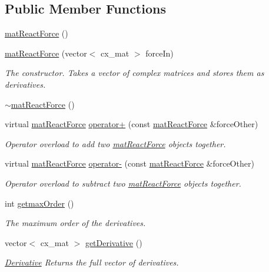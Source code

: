 \subsection*{Public Member Functions}
\begin{DoxyCompactItemize}
\item 
\hyperlink{classmat_react_force_a99fcb09f4058b81d1006fe06b3376545}{mat\-React\-Force} ()
\item 
\hyperlink{classmat_react_force_a153e4fb02d198b3cbd3c9943f6e21923}{mat\-React\-Force} (vector$<$ cx\-\_\-mat $>$ force\-In)
\begin{DoxyCompactList}\small\item\em The constructor. Takes a vector of complex matrices and stores them as derivatives. \end{DoxyCompactList}\item 
\hyperlink{classmat_react_force_a2d6e43b1a9fcff98e1c2ead6c1c3e0c6}{$\sim$mat\-React\-Force} ()
\item 
virtual \hyperlink{classmat_react_force}{mat\-React\-Force} \hyperlink{classmat_react_force_aed364735975e65fe52ee9425b15ac839}{operator+} (const \hyperlink{classmat_react_force}{mat\-React\-Force} \&force\-Other)
\begin{DoxyCompactList}\small\item\em Operator overload to add two \hyperlink{classmat_react_force}{mat\-React\-Force} objects together. \end{DoxyCompactList}\item 
virtual \hyperlink{classmat_react_force}{mat\-React\-Force} \hyperlink{classmat_react_force_a0294972a0d151ae787f1593bf45aaf9e}{operator-\/} (const \hyperlink{classmat_react_force}{mat\-React\-Force} \&force\-Other)
\begin{DoxyCompactList}\small\item\em Operator overload to subtract two \hyperlink{classmat_react_force}{mat\-React\-Force} objects together. \end{DoxyCompactList}\item 
int \hyperlink{classmat_react_force_a91c2d98f7fe7e316f728840daad6bf70}{getmax\-Order} ()
\begin{DoxyCompactList}\small\item\em The maximum order of the derivatives. \end{DoxyCompactList}\item 
vector$<$ cx\-\_\-mat $>$ \hyperlink{classmat_react_force_a1fccdee7a9611e8ac3b6e0e3cd843124}{get\-Derivative} ()
\begin{DoxyCompactList}\small\item\em \hyperlink{class_derivative}{Derivative} Returns the full vector of derivatives. \end{DoxyCompactList}\item 

\end{DoxyCompactItemize}
